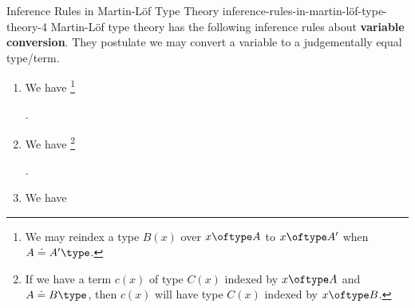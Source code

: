 \begin{definition}{Inference Rules in Martin-Löf Type Theory \rmIV}{inference-rules-in-martin-löf-type-theory-4}%
    Martin-Löf type theory has the following inference rules about \textbf{variable conversion}. They postulate we may convert a variable to a judgementally equal type/term.%
    \begin{enumerate}
        \item\label{inference-rules-in-martin-löf-type-theory-4-variable-conversion-for-types}We have%
            \footnote{%
                We may reindex a type $B(x)$ over $x\oftype A$ to $x\oftype A'$ when $A\doteq A'\type$.
            }%
            \begin{webprooftree}%
                \begin{prooftree}%
                \end{prooftree}%
                .%
            \end{webprooftree}%
        \item\label{inference-rules-in-martin-löf-type-theory-4-variable-conversion-for-terms}We have%
            \footnote{%
                If we have a term $c(x)$ of type $C(x)$ indexed by $x\oftype A$ and $A\doteq B\type$, then $c(x)$ will have type $C(x)$ indexed by $x\oftype B$.
            }%
            \begin{webprooftree}%
                \begin{prooftree}%
                \end{prooftree}%
                .%
            \end{webprooftree}%
        \item\label{inference-rules-in-martin-löf-type-theory-4-variable-conversion-for-judgemental-equality-of-types}We have%

\end{enumerate}
\end{definition}
